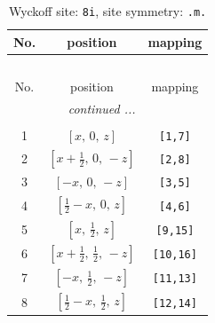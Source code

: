 \documentclass[fleqn,8pt]{jsarticle}
\begin{document}
\begin{longtable}{ccc}
\caption{Wyckoff site: {\tt 8i}, site symmetry: {\tt .m.}}
 \\
 \hline \hline
No. & position & mapping \\ \hline \endfirsthead

\multicolumn{2}{l}{\tablename\ \thetable{}} \\
 \hline \hline
No. & position & mapping \\ \hline \endhead

 \hline \hline
\multicolumn{2}{r}{\footnotesize\it continued ...} \\ \endfoot

 \hline \hline
\multicolumn{2}{r}{} \\ \endlastfoot

1 & $\left[ x,\, 0,\, z \right]$ & {\tt [1,7]} \\ \hline
2 & $\left[ x + \frac{1}{2},\, 0,\, - z \right]$ & {\tt [2,8]} \\ \hline
3 & $\left[ - x,\, 0,\, - z \right]$ & {\tt [3,5]} \\ \hline
4 & $\left[ \frac{1}{2} - x,\, 0,\, z \right]$ & {\tt [4,6]} \\ \hline
5 & $\left[ x,\, \frac{1}{2},\, z \right]$ & {\tt [9,15]} \\ \hline
6 & $\left[ x + \frac{1}{2},\, \frac{1}{2},\, - z \right]$ & {\tt [10,16]} \\ \hline
7 & $\left[ - x,\, \frac{1}{2},\, - z \right]$ & {\tt [11,13]} \\ \hline
8 & $\left[ \frac{1}{2} - x,\, \frac{1}{2},\, z \right]$ & {\tt [12,14]} \\
\end{longtable}
\renewcommand{\arraystretch}{1.2}
\end{document}
